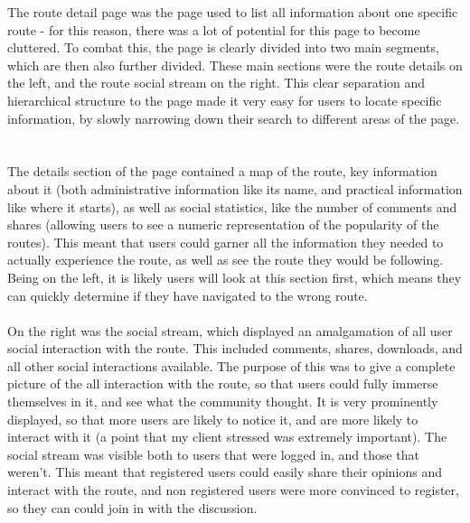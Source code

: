 \noindent
The route detail page was the page used to list all information about one specific route - for this reason, there was a lot of potential for this page to become cluttered. To combat this, the page is clearly divided into two main segments, which are then also further divided. These main sections were the route details on the left, and the route social stream on the right. This clear separation and hierarchical structure to the page made it very easy for users to locate specific information, by slowly narrowing down their search to different areas of the page. \ \\
\ \\
The details section of the page contained a map of the route, key information about it (both administrative information like its name, and practical information like where it starts), as well as social statistics, like the number of comments and shares (allowing users to see a numeric representation of the popularity of the routes). This meant that users could garner all the information they needed to actually experience the route, as well as see the route they would be following. Being on the left, it is likely users will look at this section first, which means they can quickly determine if they have navigated to the wrong route.\ \\
\ \\
On the right was the social stream, which displayed an amalgamation of all user social interaction with the route. This included comments, shares, downloads, and all other social interactions available. The purpose of this was to give a complete picture of the all interaction with the route, so that users could fully immerse themselves in it, and see what the community thought. It is very prominently displayed, so that more users are likely to notice it, and are more likely to interact with it (a point that my client stressed was extremely important). The social stream was visible both to users that were logged in, and those that weren't. This meant that registered users could easily share their opinions and interact with the route, and non registered users were more convinced to register, so they can could join in with the discussion.

